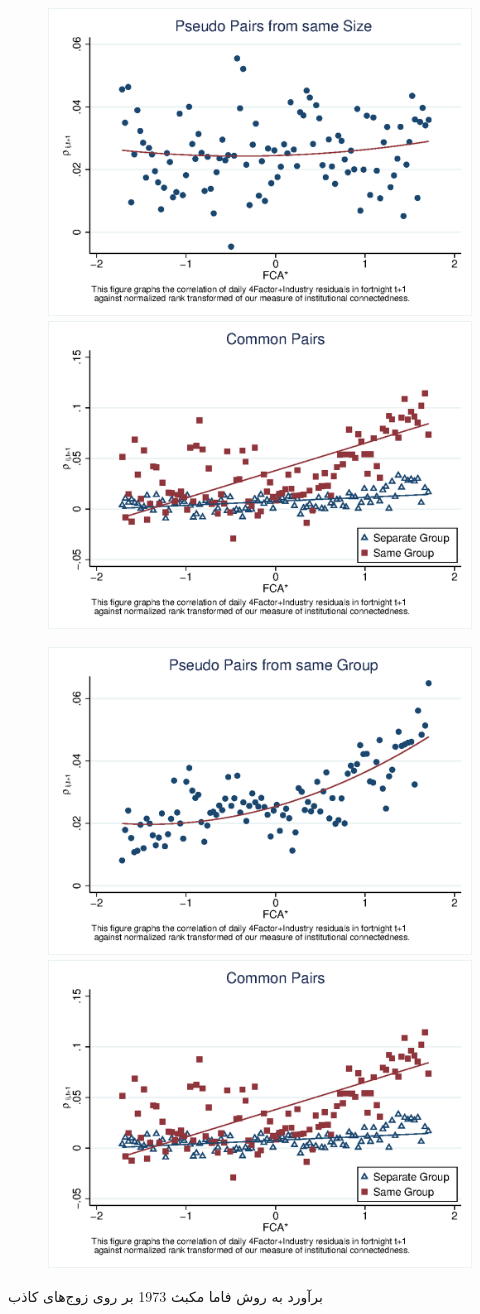 \documentclass[12pt]{article}
\begin{document}
\begin{figure}[htbp]
\centering
\includegraphics[width=0.45\linewidth]{PseudoSwcorr.eps}
\includegraphics[width=0.45\linewidth]{wcorr5g.eps}
\end{figure}

\begin{figure}[htbp]
\centering
\includegraphics[width=0.45\linewidth]{PseudoGwcorr.eps}
\includegraphics[width=0.45\linewidth]{wcorr5g.eps}
\end{figure}





\begin{table}[htbp]
\centering
\begin{LTR}
\lr{
   \resizebox{\textwidth}{!}{
   
   }
   }
\end{LTR}
\caption{ برآورد به روش فاما مکبث 1973 بر روی زوج‌های کاذب}
\label{t21}
\end{table}
\end{document}
